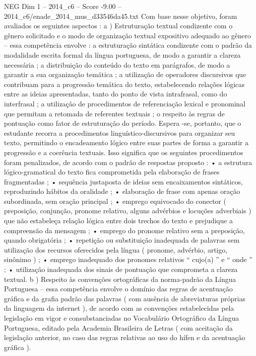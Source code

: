 \begin{textsample}{NEG Dim 1 – 2014\_c6 – Score -9.00 – 2014\_c6/enade\_2014\_mus\_d33546da45.txt}
Com base nesse objetivo, foram avaliados os seguintes aspectos : a ) Estruturação textual condizente com o gênero solicitado e o modo de organização textual expositivo adequado ao gênero – essa competência envolve : a estruturação sintática condizente com o padrão da modalidade escrita formal da língua portuguesa, de modo a garantir a clareza necessária ; a distribuição do conteúdo do texto em parágrafos, de modo a garantir a sua organização temática ; a utilização de operadores discursivos que contribuam para a progressão temática do texto, estabelecendo relações lógicas entre as ideias apresentadas, tanto do ponto de vista intrafrasal, como do interfrasal ; a utilização de procedimentos de referenciação lexical e pronominal que permitam a retomada de referentes textuais ; o respeito às regras de pontuação como fator de estruturação do período.
Espera -se, portanto, que o estudante recorra a procedimentos linguístico-discursivos para organizar seu texto, permitindo o encadeamento lógico entre suas partes de forma a garantir a progressão e a coerência textuais.
Isso significa que os seguintes procedimentos foram penalizados, de acordo com o padrão de respostas proposto : • a estrutura lógico-gramatical do texto fica comprometida pela elaboração de frases fragmentadas ; • sequência justaposta de ideias sem encaixamentos sintáticos, reproduzindo hábitos da oralidade ; • elaboração de frase com apenas oração subordinada, sem oração principal ; • emprego equivocado do conector ( preposição, conjunção, pronome relativo, alguns advérbios e locuções adverbiais ) que não estabeleça relação lógica entre dois trechos do texto e prejudique a compreensão da mensagem ; • emprego do pronome relativo sem a preposição, quando obrigatória ; • repetição ou substituição inadequada de palavras sem utilização dos recursos oferecidos pela língua ( pronome, advérbio, artigo, sinônimo ) ; • emprego inadequado dos pronomes relativos “ cujo(a) ” e “ onde ” ; • utilização inadequada dos sinais de pontuação que comprometa a clareza textual. b ) Respeito às convenções ortográficas da norma-padrão da Língua Portuguesa – essa competência envolve o domínio das regras de acentuação gráfica e da grafia padrão das palavras ( com ausência de abreviaturas próprias da linguagem da internet ), de acordo com as convenções estabelecidas pela legislação em vigor e consubstanciadas no Vocabulário Ortográfico da Língua Portuguesa, editado pela Academia Brasileira de Letras ( com aceitação da legislação anterior, no caso das regras relativas ao uso do hífen e da acentuação gráfica ).

\end{textsample}
